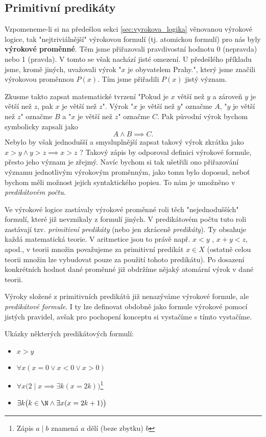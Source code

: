 \subsection{Primitivní predikáty}\label{subsec:primitivni_predikaty}
Vzpomeneme-li si na předešlou sekci \ref{sec:vyrokova_logika} věnovanou výrokové logice, tak "nejtriviálnější" výrokovou formulí (tj. atomickou formulí) pro nás byly \textbf{výrokové proměnné}. Těm jsme přiřazovali pravdivostní hodnotu 0 (nepravda) nebo 1 (pravda). V tomto se však nachází jisté omezení. U předešlého příkladu jsme, kromě jiných, uvažovali výrok "$x$ je obyvatelem Prahy.", který jsme značili výrokovou proměnnou $P(x)$. Tím jsme přiřadili $P(x)$ jistý význam.\par
Zkusme takto zapsat matematické tvrzení "Pokud je $x$ větší než $y$ a zároveň $y$ je větší než $z$, pak $x$ je větší než $z$". Výrok "$x$ je větší než $y$" označme $A$, "$y$ je větší než $z$" označme $B$ a "$x$ je větší než $z$" označme $C$. Pak původní výrok bychom symbolicky zapsali jako
\begin{equation*}
    A \land B \implies C.
\end{equation*}
Nebylo by však jednodušší a smysluplnější zapsat takový výrok zkrátka jako $x>y \land y>z \implies x>z$ ? Takový zápis by odporoval definici výrokové formule, přesto jeho význam je zřejmý. Navíc bychom si tak ušetřili ono přiřazování významu jednotlivým výrokovým proměnným, jako tomu bylo doposud, neboť bychom měli možnost jejich syntaktického popisu. To nám je umožněno v \emph{predikátovém počtu}.\par
Ve výrokové logice zastávaly výrokové proměnné roli těch "nejednodušších" formulí, které již nevznikaly z formulí jiných. V predikátovém počtu tuto roli zastávají tzv. \emph{primitivní predikáty} (nebo jen zkráceně \emph{predikáty}). Ty obsahuje každá matematická teorie. V aritmetice jsou to právě např. $x<y$ , $x+y<z$, apod., v teorii množin považujeme za primitivní predikát $x\in X$ (ostatně celou teorii množin lze vybudovat pouze za použití tohoto predikátu). Po dosazení konkrétních hodnot dané proměnné již obdržíme nějaký atomární výrok v dané teorii.\par
Výroky složené z primitivních predikátů již nenazýváme výrokové formule, ale \emph{predikátové formule}. I ty lze definovat obdobně jako formule výrokové pomocí jistých pravidel, avšak pro pochopení konceptu si vystačíme s tímto vystačíme.
\begin{example}
    Ukázky některých predikátových formulí:
    \begin{itemize}
        \item $x>y$
        \item $\forall x (x = 0 \lor x < 0 \lor x > 0)$
        \item $\forall x \bigl(2 \mid x \implies \exists k (x=2k)\bigr)$\footnote{Zápis $a \mid b$ znamená $a$ dělí (beze zbytku) $b$}
        \item $\exists k \bigl(k \in \N \land \exists x (x=2k+1)\bigr)$
    \end{itemize}
\end{example}

